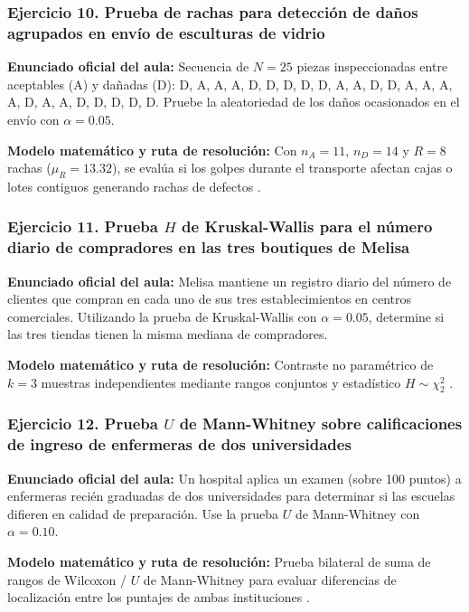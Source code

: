{\subsubsection*{Ejercicio 10. Prueba de rachas para detección de daños agrupados en envío de esculturas de vidrio}
\textbf{Enunciado oficial del aula:} Secuencia de $N = 25$ piezas inspeccionadas entre aceptables (A) y dañadas (D): D, A, A, A, D, D, D, D, D, A, A, D, D, A, A, A, A, D, A, A, D, D, D, D, D. Pruebe la aleatoriedad de los daños ocasionados en el envío con $\alpha = 0.05$.

\textbf{Modelo matemático y ruta de resolución:} Con $n_A = 11$, $n_D = 14$ y $R = 8$ rachas ($\mu_R = 13.32$), se evalúa si los golpes durante el transporte afectan cajas o lotes contiguos generando rachas de defectos \citep{levin2004}.

\subsubsection*{Ejercicio 11. Prueba $H$ de Kruskal-Wallis para el número diario de compradores en las tres boutiques de Melisa}
\textbf{Enunciado oficial del aula:} Melisa mantiene un registro diario del número de clientes que compran en cada uno de sus tres establecimientos en centros comerciales. Utilizando la prueba de Kruskal-Wallis con $\alpha = 0.05$, determine si las tres tiendas tienen la misma mediana de compradores.

\textbf{Modelo matemático y ruta de resolución:} Contraste no paramétrico de $k = 3$ muestras independientes mediante rangos conjuntos y estadístico $H \sim \chi^2_{2}$ \citep{levin2004,lind2012}.

\subsubsection*{Ejercicio 12. Prueba $U$ de Mann-Whitney sobre calificaciones de ingreso de enfermeras de dos universidades}
\textbf{Enunciado oficial del aula:} Un hospital aplica un examen (sobre 100 puntos) a enfermeras recién graduadas de dos universidades para determinar si las escuelas difieren en calidad de preparación. Use la prueba $U$ de Mann-Whitney con $\alpha = 0.10$.

\textbf{Modelo matemático y ruta de resolución:} Prueba bilateral de suma de rangos de Wilcoxon / $U$ de Mann-Whitney para evaluar diferencias de localización entre los puntajes de ambas instituciones \citep{levin2004}.


}
